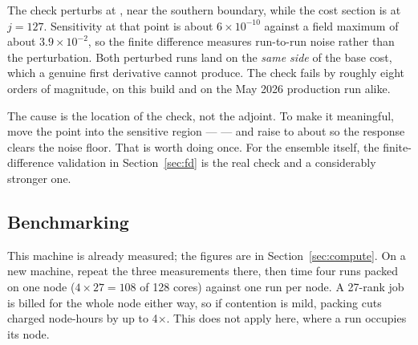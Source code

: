 The check perturbs  at
, near the southern boundary, while the
cost section is at $j=127$. Sensitivity at that point is about
$6\times10^{-10}$ against a field maximum of about $3.9\times10^{-2}$, so the
finite difference measures run-to-run noise rather than the perturbation. Both
perturbed runs land on the \emph{same side} of the base cost, which a genuine
first derivative cannot produce. The check fails by roughly eight orders of
magnitude, on this build and on the May 2026 production run alike.

The cause is the location of the check, not the adjoint. To make it meaningful,
move the point into the sensitive region ---
 --- and raise  to
about  so the response clears the noise floor. That is worth doing
once. For the ensemble itself, the finite-difference validation in
Section~\ref{sec:fd} is the real check and a considerably stronger one.

\subsection{Benchmarking}

This machine is already measured; the figures are in
Section~\ref{sec:compute}. On a new machine, repeat the three measurements
there, then time four runs packed on one node ($4\times27 = 108$ of 128 cores)
against one run per node. A 27-rank job is billed for the whole node either way,
so if contention is mild, packing cuts charged node-hours by up to 4$\times$.
This does not apply here, where a run occupies its node.

